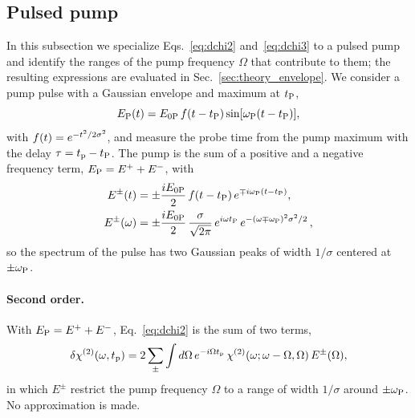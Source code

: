 \documentclass[aps,prb,reprint,superscriptaddress,amsmath,amssymb]{revtex4-2}
\begin{document}
\subsection{Pulsed pump}
\label{sec:theory_pulse}

In this subsection we specialize Eqs.~\eqref{eq:dchi2} and~\eqref{eq:dchi3} to a pulsed pump and identify the ranges
of the pump frequency $\Omega$ that contribute to them; the resulting expressions are evaluated in
Sec.~\ref{sec:theory_envelope}.
We consider a pump pulse with a Gaussian envelope and maximum at $t_{\mathrm{P}}$,
\begin{equation}
E_{\mathrm{P}}(t) = E_{0\mathrm{P}}\,f(t-t_{\mathrm{P}})\sin[\omega_{\mathrm{P}}(t-t_{\mathrm{P}})] ,
\label{eq:pump_pulse}
\end{equation}
with $f(t) = e^{-t^2/2\sigma^2}$, and measure the probe time from the pump maximum with the delay
$\tau = t_{\mathrm{p}}-t_{\mathrm{P}}$. The pump is the sum of a positive and a negative frequency term, $E_{\mathrm{P}} = E^++E^-$, with
\begin{align}
E^\pm(t) &= \pm\frac{iE_{0\mathrm{P}}}{2}\,f(t-t_{\mathrm{P}})\,e^{\mp i\omega_{\mathrm{P}}(t-t_{\mathrm{P}})} , \nonumber\\
E^\pm(\omega) &= \pm\frac{iE_{0\mathrm{P}}}{2}\,\frac{\sigma}{\sqrt{2\pi}}\,e^{i\omega t_{\mathrm{P}}}\,e^{-(\omega\mp\omega_{\mathrm{P}})^2\sigma^2/2} \, ,
\label{eq:pump_terms}
\end{align}
so the spectrum of the pulse has two Gaussian peaks of width $1/\sigma$ centered at $\pm\omega_{\mathrm{P}}$.

\paragraph{Second order.} With $E_{\mathrm{P}} = E^++E^-$, Eq.~\eqref{eq:dchi2} is the sum of two terms,
\begin{equation}
\delta\chi^{(2)}(\omega,t_{\mathrm{p}}) = 2\sum_\pm\int d\Omega\,e^{-i\Omega t_{\mathrm{p}}}\,\chi^{(2)}(\omega;\omega-\Omega,\Omega)\,
E^\pm(\Omega) ,
\label{eq:dchi2_pulse}
\end{equation}
in which $E^\pm$ restrict the pump frequency $\Omega$ to a range of width $1/\sigma$ around $\pm\omega_{\mathrm{P}}$. No approximation
is made.
\end{document}
